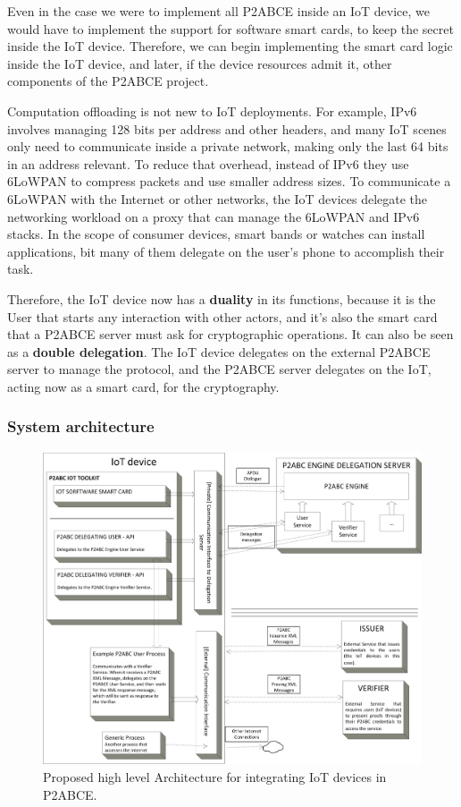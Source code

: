 \documentclass[journal]{IEEEtran}
\begin{document}
Even in the case we were to implement all P2ABCE inside an IoT device, we would have to implement the support for software smart cards, to keep the secret inside the IoT device. Therefore, we can begin implementing the smart card logic inside the IoT device, and later, if the device resources admit it, other components of the P2ABCE project.


\hfil

Computation offloading is not new to IoT deployments. For example, IPv6 involves managing 128 bits per address and other headers, and many IoT scenes only need to communicate inside a private network, making only the last 64 bits in an address relevant. To reduce that overhead, instead of IPv6 they use 6LoWPAN to compress packets and use smaller address sizes. To communicate a 6LoWPAN with the Internet or other networks, the IoT devices delegate the networking workload on a proxy that can manage the 6LoWPAN and IPv6 stacks. In the scope of consumer devices, smart bands or watches can install applications, bit many of them delegate on the user's phone to accomplish their task.

Therefore, the IoT device now has a \textbf{duality} in its functions, because it is the User that starts any interaction with other actors, and it's also the smart card that a P2ABCE server must ask for cryptographic operations. It can also be seen as a \textbf{double delegation}. The IoT device delegates on the external P2ABCE server to manage the protocol, and the P2ABCE server delegates on the IoT, acting now as a smart card, for the cryptography.

\subsubsection{System architecture}



\begin{figure}[bth]
	\begin{center}
		\includegraphics[width=\linewidth]{gfx/P2ABCE-IoT-bw}
	\end{center}
	\caption{Proposed high level Architecture for integrating IoT devices in P2ABCE.}
	\label{fig:P2ABCE-IoT}
\end{figure}
\end{document}
